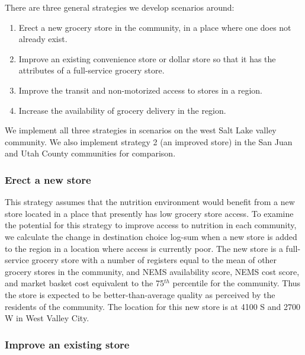 \documentclass[
  letterpaper,
  number,
  review,
  3p]{elsarticle}
\providecommand{\tightlist}{%
  \setlength{\itemsep}{0pt}\setlength{\parskip}{0pt}}\usepackage{longtable,booktabs,array}
\begin{document}
There are three general strategies we develop scenarios around:

\begin{enumerate}
\def\labelenumi{\arabic{enumi}.}
\tightlist
\item
  Erect a new grocery store in the community, in a place where one does
  not already exist.
\item
  Improve an existing convenience store or dollar store so that it has
  the attributes of a full-service grocery store.
\item
  Improve the transit and non-motorized access to stores in a region.
\item
  Increase the availability of grocery delivery in the region.
\end{enumerate}

We implement all three strategies in scenarios on the west Salt Lake
valley community. We also implement strategy 2 (an improved store) in
the San Juan and Utah County communities for comparison.

\subsubsection{Erect a new store}\label{erect-a-new-store}

This strategy assumes that the nutrition environment would benefit from
a new store located in a place that presently has low grocery store
access. To examine the potential for this strategy to improve access to
nutrition in each community, we calculate the change in destination
choice log-sum when a new store is added to the region in a location
where access is currently poor. The new store is a full-service grocery
store with a number of registers equal to the mean of other grocery
stores in the community, and NEMS availability score, NEMS cost score,
and market basket cost equivalent to the 75\(^{th}\) percentile for the
community. Thus the store is expected to be better-than-average quality
as perceived by the residents of the community. The location for this
new store is at 4100 S and 2700 W in West Valley City.

\subsubsection{Improve an existing
store}\label{improve-an-existing-store}
\end{document}
